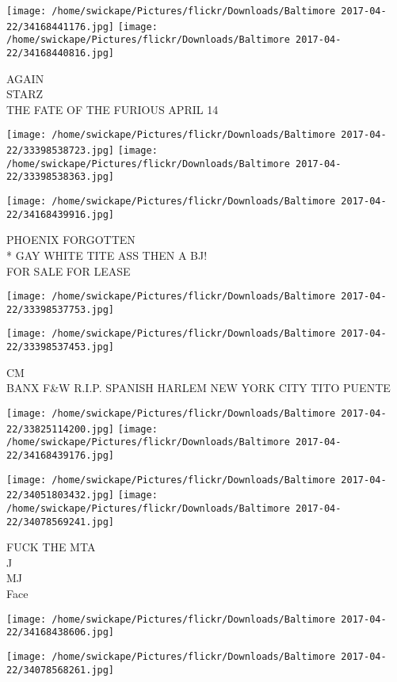 \documentclass[10pt,letterpaper]{article}
\begin{document}
\vspace{0.25in}
\texttt{[image: /home/swickape/Pictures/flickr/Downloads/Baltimore 2017-04-22/34168441176.jpg]}
\texttt{[image: /home/swickape/Pictures/flickr/Downloads/Baltimore 2017-04-22/34168440816.jpg]}

AGAIN\\
STARZ\\
THE FATE OF THE FURIOUS APRIL 14
\pagebreak

\texttt{[image: /home/swickape/Pictures/flickr/Downloads/Baltimore 2017-04-22/33398538723.jpg]}
\texttt{[image: /home/swickape/Pictures/flickr/Downloads/Baltimore 2017-04-22/33398538363.jpg]}

\texttt{[image: /home/swickape/Pictures/flickr/Downloads/Baltimore 2017-04-22/34168439916.jpg]}

PHOENIX FORGOTTEN\\
* GAY WHITE TITE ASS THEN A BJ!\\
FOR SALE FOR LEASE
\pagebreak

\texttt{[image: /home/swickape/Pictures/flickr/Downloads/Baltimore 2017-04-22/33398537753.jpg]}

\vspace{0.25in}
\texttt{[image: /home/swickape/Pictures/flickr/Downloads/Baltimore 2017-04-22/33398537453.jpg]}

CM\\
BANX F\&W R.I.P. SPANISH HARLEM NEW YORK CITY TITO PUENTE
\pagebreak

\texttt{[image: /home/swickape/Pictures/flickr/Downloads/Baltimore 2017-04-22/33825114200.jpg]}
\texttt{[image: /home/swickape/Pictures/flickr/Downloads/Baltimore 2017-04-22/34168439176.jpg]}

\texttt{[image: /home/swickape/Pictures/flickr/Downloads/Baltimore 2017-04-22/34051803432.jpg]}
\texttt{[image: /home/swickape/Pictures/flickr/Downloads/Baltimore 2017-04-22/34078569241.jpg]}

FUCK THE MTA\\
J\\
MJ\\
Face
\pagebreak

\texttt{[image: /home/swickape/Pictures/flickr/Downloads/Baltimore 2017-04-22/34168438606.jpg]}

\vspace{0.25in}
\texttt{[image: /home/swickape/Pictures/flickr/Downloads/Baltimore 2017-04-22/34078568261.jpg]}
\end{document}
